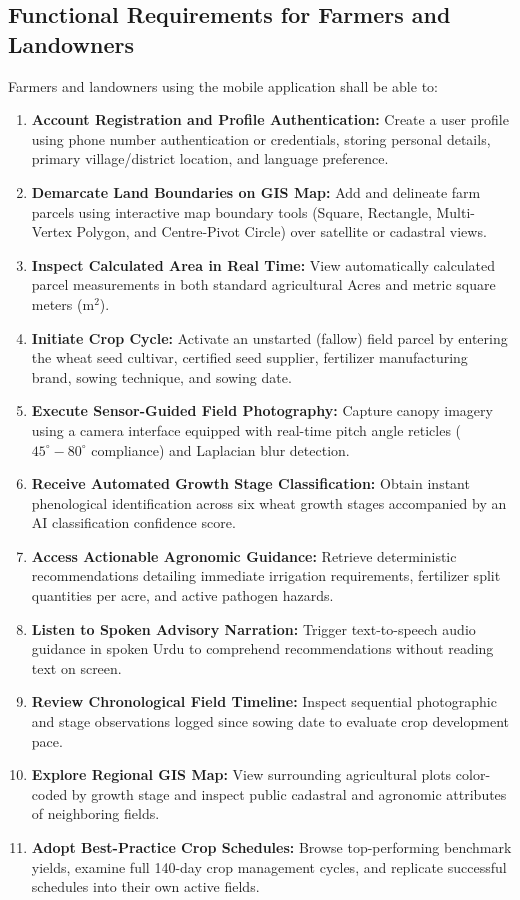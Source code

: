\documentclass{FastFyp}
\begin{document}
\subsection{Functional Requirements for Farmers and Landowners}
Farmers and landowners using the mobile application shall be able to:
\begin{enumerate}
    \item \textbf{Account Registration and Profile Authentication:} Create a user profile using phone number authentication or credentials, storing personal details, primary village/district location, and language preference.
    \item \textbf{Demarcate Land Boundaries on GIS Map:} Add and delineate farm parcels using interactive map boundary tools (Square, Rectangle, Multi-Vertex Polygon, and Centre-Pivot Circle) over satellite or cadastral views.
    \item \textbf{Inspect Calculated Area in Real Time:} View automatically calculated parcel measurements in both standard agricultural Acres and metric square meters ($\text{m}^2$).
    \item \textbf{Initiate Crop Cycle:} Activate an unstarted (fallow) field parcel by entering the wheat seed cultivar, certified seed supplier, fertilizer manufacturing brand, sowing technique, and sowing date.
    \item \textbf{Execute Sensor-Guided Field Photography:} Capture canopy imagery using a camera interface equipped with real-time pitch angle reticles ($45^\circ - 80^\circ$ compliance) and Laplacian blur detection.
    \item \textbf{Receive Automated Growth Stage Classification:} Obtain instant phenological identification across six wheat growth stages accompanied by an AI classification confidence score.
    \item \textbf{Access Actionable Agronomic Guidance:} Retrieve deterministic recommendations detailing immediate irrigation requirements, fertilizer split quantities per acre, and active pathogen hazards.
    \item \textbf{Listen to Spoken Advisory Narration:} Trigger text-to-speech audio guidance in spoken Urdu to comprehend recommendations without reading text on screen.
    \item \textbf{Review Chronological Field Timeline:} Inspect sequential photographic and stage observations logged since sowing date to evaluate crop development pace.
    \item \textbf{Explore Regional GIS Map:} View surrounding agricultural plots color-coded by growth stage and inspect public cadastral and agronomic attributes of neighboring fields.
    \item \textbf{Adopt Best-Practice Crop Schedules:} Browse top-performing benchmark yields, examine full 140-day crop management cycles, and replicate successful schedules into their own active fields.
\end{enumerate}
\end{document}
